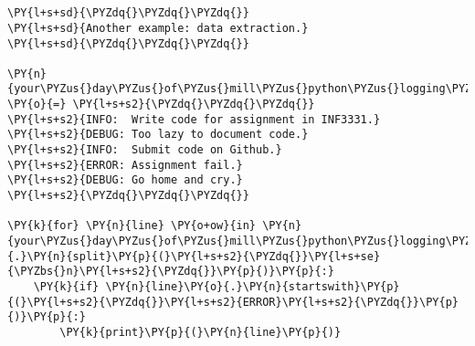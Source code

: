 

\section*{}

\begin{Verbatim}[commandchars=\\\{\}]
\PY{l+s+sd}{\PYZdq{}\PYZdq{}\PYZdq{}}
\PY{l+s+sd}{Another example: data extraction.}
\PY{l+s+sd}{\PYZdq{}\PYZdq{}\PYZdq{}}

\PY{n}{your\PYZus{}day\PYZus{}of\PYZus{}mill\PYZus{}python\PYZus{}logging\PYZus{}file} \PY{o}{=} \PY{l+s+s2}{\PYZdq{}\PYZdq{}\PYZdq{}}
\PY{l+s+s2}{INFO:  Write code for assignment in INF3331.}
\PY{l+s+s2}{DEBUG: Too lazy to document code.}
\PY{l+s+s2}{INFO:  Submit code on Github.}
\PY{l+s+s2}{ERROR: Assignment fail.}
\PY{l+s+s2}{DEBUG: Go home and cry.}
\PY{l+s+s2}{\PYZdq{}\PYZdq{}\PYZdq{}}

\PY{k}{for} \PY{n}{line} \PY{o+ow}{in} \PY{n}{your\PYZus{}day\PYZus{}of\PYZus{}mill\PYZus{}python\PYZus{}logging\PYZus{}file}\PY{o}{.}\PY{n}{split}\PY{p}{(}\PY{l+s+s2}{\PYZdq{}}\PY{l+s+se}{\PYZbs{}n}\PY{l+s+s2}{\PYZdq{}}\PY{p}{)}\PY{p}{:}
    \PY{k}{if} \PY{n}{line}\PY{o}{.}\PY{n}{startswith}\PY{p}{(}\PY{l+s+s2}{\PYZdq{}}\PY{l+s+s2}{ERROR}\PY{l+s+s2}{\PYZdq{}}\PY{p}{)}\PY{p}{:}
        \PY{k}{print}\PY{p}{(}\PY{n}{line}\PY{p}{)}
\end{Verbatim}

